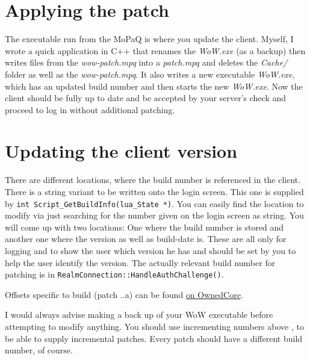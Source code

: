 \documentclass{article}
\newcommand{\mpq}{MoPaQ\xspace}
\newcommand{\file}[1]{\emph{#1}\xspace}
\begin{document}
\section{Applying the patch}

The executable run from the \mpq is where you update the client. Myself, I wrote a quick application in C++ that renames the \file{WoW.exe} (as a backup) then writes files from the \file{wow-patch.mpq} into a \file{patch.mpq} and deletes the \file{Cache/} folder as well as the \file{wow-patch.mpq}. It also writes a new executable \file{WoW.exe}, which has an updated build number and then starts the new \file{WoW.exe}. Now the client should be fully up to date and be accepted by your server's check and proceed to log in without additional patching.

\section{Updating the client version}

There are different locations, where the build number is referenced in the client. There is a string variant to be written onto the login screen. This one is supplied by \lstinline{int Script_GetBuildInfo(lua_State *)}. You can easily find the location to modify via just searching for the number given on the login screen as string. You will come up with two locations: One where the build number is stored and another one where the version as well as build-date is. These are all only for logging and to show the user which version he has and should be set by you to help the user identify the version. The actually relevant build number for patching is in \lstinline{RealmConnection::HandleAuthChallenge()}.

Offsets specific to build  (patch ..a) can be found \href{http://www.ownedcore.com/forums/general/programming/326606-wow-exe-custom-build.html}{on OwnedCore}.

I would always advise making a back up of your WoW executable before attempting to modify anything. You should use incrementing numbers above , to be able to supply incremental patches. Every patch should have a different build number, of course.
\end{document}

